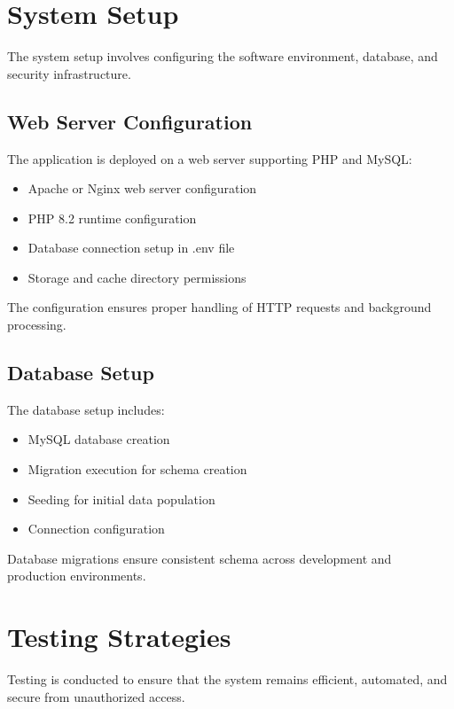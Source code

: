 \section{System Setup}

The system setup involves configuring the software environment, database, and security infrastructure.

\subsection{Web Server Configuration}

The application is deployed on a web server supporting PHP and MySQL:

\begin{itemize}
    \item Apache or Nginx web server configuration
    \item PHP 8.2 runtime configuration
    \item Database connection setup in .env file
    \item Storage and cache directory permissions
\end{itemize}

The configuration ensures proper handling of HTTP requests and background processing.

\subsection{Database Setup}

The database setup includes:

\begin{itemize}
    \item MySQL database creation
    \item Migration execution for schema creation
    \item Seeding for initial data population
    \item Connection configuration
\end{itemize}

Database migrations ensure consistent schema across development and production environments.

\section{Testing Strategies}

Testing is conducted to ensure that the system remains efficient, automated, and secure from unauthorized access.

